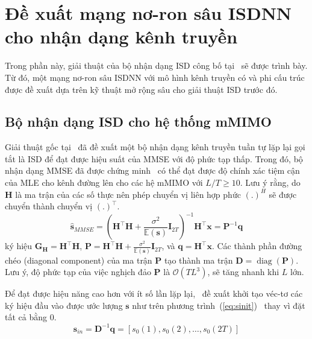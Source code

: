 \section{Đề xuất mạng nơ-ron sâu ISDNN cho nhận dạng kênh truyền}

Trong phần này, giải thuật của bộ nhận dạng ISD công bố tại~\cite{Mandloi2017} sẽ được trình bày. Từ đó, một mạng nơ-ron sâu ISDNN với mô hình kênh truyền có và phi cấu trúc được đề xuất dựa trên kỹ thuật mở rộng sâu cho giải thuật ISD trước đó.

\subsection{Bộ nhận dạng ISD cho hệ thống mMIMO}

Giải thuật gốc tại~\cite{Mandloi2017} đã đề xuất một bộ nhận dạng kênh truyền tuần tự lặp lại gọi tắt là ISD để đạt được hiệu suất của MMSE với độ phức tạp thấp. Trong đó, bộ nhận dạng MMSE đã được chứng minh~\cite{Rusek2013} có thể đạt được độ chính xác tiệm cận của MLE cho kênh đường lên cho các hệ mMIMO với $L/T \ge 10$. Lưu ý rằng, do $\mathbf{H}$ là ma trận của các số thực nên phép chuyển vị liên hợp phức $(.)^H$ sẽ được chuyển thành chuyển vị $(.)^\top$.
\begin{equation}
    \hat{\mathbf{s}}_{MMSE}=\left(\mathbf{H}^\top \mathbf{H}+\frac{\sigma^2}{\mathbb{E}(\mathbf{s})} \mathbf{I}_{2T}\right)^{-1} \mathbf{H}^\top \mathbf{x}=\mathbf{P}^{-1} \mathbf{q}
\end{equation}
ký hiệu $\mathbf{G}_\mathbf{H} = \mathbf{H}^\top \mathbf{H}$, $\mathbf{P} = \mathbf{H}^\top \mathbf{H}+\frac{\sigma^2}{\mathbb{E}(\mathbf{s})} \mathbf{I}_{2T}$, và $\mathbf{q} = \mathbf{H}^\top \mathbf{x}$. 
Các thành phần đường chéo (diagonal component) của ma trận $\mathbf{P}$ tạo thành ma trận $\mathbf{D} = \operatorname{diag}(\mathbf{P})$.
Lưu ý, độ phức tạp của việc nghịch đảo $\mathbf{P}$ là $\mathcal{O}(TL^3)$, sẽ tăng nhanh khi $L$ lớn. 

Để đạt được hiệu năng cao hơn với ít số lần lặp lại,~\cite{Mandloi2017} đề xuất khởi tạo véc-tơ các ký hiệu đầu vào được ước lượng $\mathbf{s}$ như trên phương trình~(\ref{eq:sinit})~\cite{Gao2014} thay vì đặt tất cả bằng $0$.
\begin{equation}
\label{eq:sinit}
    \mathbf{s}_{in}=\mathbf{D}^{-1} \mathbf{q}=\left[s_0(1), s_0(2), \ldots, s_0(2T)\right]
\end{equation}

